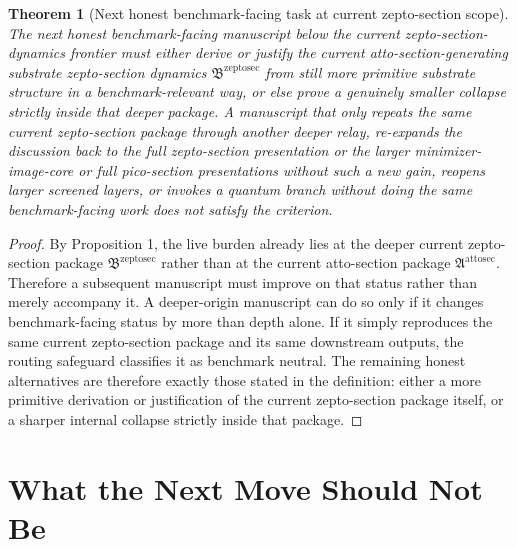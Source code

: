 \documentclass[11pt]{article}
\newcommand{\AttoSectionPackage}{\mathfrak A^{\mathrm{attosec}}}
\newcommand{\ZeptoSectionPackage}{\mathfrak B^{\mathrm{zeptosec}}}
\newtheorem{theorem}{Theorem}
\begin{document}
\begin{theorem}[Next honest benchmark-facing task at current zepto-section scope]
The next honest benchmark-facing manuscript below the current zepto-section-dynamics frontier must either derive or justify the current atto-section-generating substrate zepto-section dynamics \(\ZeptoSectionPackage\) from still more primitive substrate structure in a benchmark-relevant way, or else prove a genuinely smaller collapse strictly inside that deeper package. A manuscript that only repeats the same current zepto-section package through another deeper relay, re-expands the discussion back to the full zepto-section presentation or the larger minimizer-image-core or full pico-section presentations without such a new gain, reopens larger screened layers, or invokes a quantum branch without doing the same benchmark-facing work does not satisfy the criterion.
\end{theorem}

\begin{proof}
By Proposition 1, the live burden already lies at the deeper current zepto-section package \(\ZeptoSectionPackage\) rather than at the current atto-section package \(\AttoSectionPackage\). Therefore a subsequent manuscript must improve on that status rather than merely accompany it. A deeper-origin manuscript can do so only if it changes benchmark-facing status by more than depth alone. If it simply reproduces the same current zepto-section package and its same downstream outputs, the routing safeguard classifies it as benchmark neutral. The remaining honest alternatives are therefore exactly those stated in the definition: either a more primitive derivation or justification of the current zepto-section package itself, or a sharper internal collapse strictly inside that package.
\end{proof}

\section{What the Next Move Should Not Be}
\end{document}
